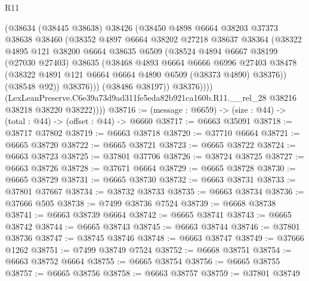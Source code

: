 \begin{lexlean}{R11}
\begin{coremodule}
                  (@38634
                    (@38445 @38638)
                    @38426
                    (@38450
                      @4898
                      @6664
                      @38203
                      @37373
                      @38638
                      @38460
                      (@38352
                        @4897
                        @6664
                        @38202
                        @27218
                        @38637
                        @38364
                        (@38322
                          @4895
                          @121
                          @38200
                          @6664
                          @38635
                          @6509
                          (@38524
                            @4894
                            @6667
                            @38199
                            (@27030 @27403)
                            @38635
                            (@38468
                              @4893
                              @6664
                              @6666
                              @6996
                              @27403
                              @38478
                              (@38322 @4891 @121 @6664 @6664 @4890 @6509 (@38373 @4890) @38376))
                            (@38548 @92))
                          @38376)))
                    (@38486 @38197))
                  @38376))))
          (LexLeanPreserve.C6e39a73d9ad311fe5eda82b921ca160b.R11.__rel_28
            @38216
            @38218
            @38220
            @38222))))
@38716 := (message : @6659) -> (size : @44) -> (total : @44) -> (offset : @44) -> @6660
@38717 := @6663 @35091
@38718 := @38717 @37802
@38719 := @6663 @38718
@38720 := @37710 @6664
@38721 := @6665 @38720
@38722 := @6665 @38721
@38723 := @6665 @38722
@38724 := @6663 @38723
@38725 := @37801 @37706
@38726 := @38724 @38725
@38727 := @6663 @38726
@38728 := @37671 @6664
@38729 := @6665 @38728
@38730 := @6665 @38729
@38731 := @6665 @38730
@38732 := @6663 @38731
@38733 := @37801 @37667
@38734 := @38732 @38733
@38735 := @6663 @38734
@38736 := @37666 @505
@38738 := @7499 @38736 @7524
@38739 := @6668 @38738
@38741 := @6663 @38739 @6664
@38742 := @6665 @38741
@38743 := @6665 @38742
@38744 := @6665 @38743
@38745 := @6663 @38744
@38746 := @37801 @38736
@38747 := @38745 @38746
@38748 := @6663 @38747
@38749 := @37666 @1262
@38751 := @7499 @38749 @7524
@38752 := @6668 @38751
@38754 := @6663 @38752 @6664
@38755 := @6665 @38754
@38756 := @6665 @38755
@38757 := @6665 @38756
@38758 := @6663 @38757
@38759 := @37801 @38749

\end{coremodule}
\end{lexlean}
